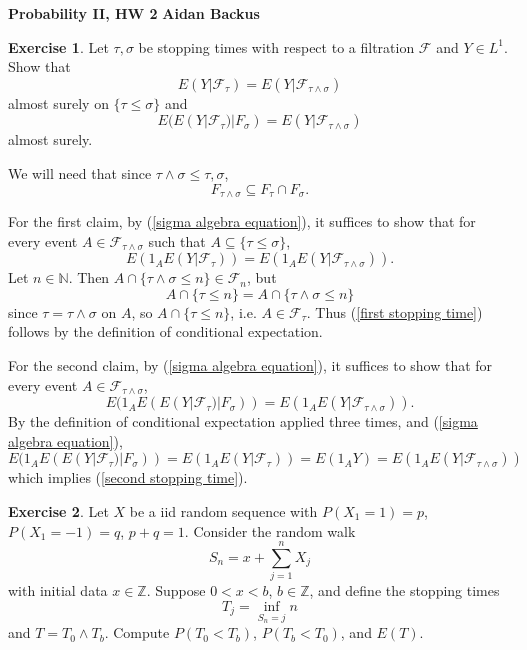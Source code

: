 \documentclass[10pt]{article}
\newcommand{\NN}{\mathbb{N}}
\newcommand{\ZZ}{\mathbb{Z}}
\theoremstyle{definition}
\newtheorem{exer}{Exercise}
\begin{document}
\noindent
\large\textbf{Probability II, HW 2} \hfill \textbf{Aidan Backus} \\

\begin{exer}
Let $\tau, \sigma$ be stopping times with respect to a filtration $\mathcal F$ and $Y \in L^1$. Show that
$$E(Y|\mathcal F_\tau) = E(Y|\mathcal F_{\tau \wedge \sigma})$$
almost surely on $\{\tau \leq \sigma\}$ and
$$E(E(Y|\mathcal F_\tau)|F_\sigma) = E(Y|\mathcal F_{\tau \wedge \sigma})$$
almost surely.
\end{exer}

We will need that since $\tau \wedge \sigma \leq \tau,\sigma$,
\begin{equation}
\label{sigma algebra equation}
F_{\tau \wedge \sigma} \subseteq F_\tau \cap F_\sigma.
\end{equation}

For the first claim, by (\ref{sigma algebra equation}), it suffices to show that for every event $A \in \mathcal F_{\tau \wedge \sigma}$ such that $A \subseteq \{\tau \leq \sigma\}$,
\begin{equation}
\label{first stopping time}
E(1_A E(Y|\mathcal F_\tau)) = E(1_A E(Y|\mathcal F_{\tau \wedge \sigma})).
\end{equation}
Let $n \in \NN$. Then $A \cap \{\tau \wedge \sigma \leq n\} \in \mathcal F_n$, but
$$A \cap \{\tau \leq n\} = A \cap \{\tau \wedge \sigma \leq n\}$$
since $\tau = \tau \wedge \sigma$ on $A$, so $A \cap \{\tau \leq n\}$, i.e. $A \in \mathcal F_\tau$.
Thus (\ref{first stopping time}) follows by the definition of conditional expectation.

For the second claim, by (\ref{sigma algebra equation}), it suffices to show that for every event $A \in \mathcal F_{\tau \wedge \sigma}$,
\begin{equation}
\label{second stopping time}
E(1_A E(E(Y|\mathcal F_\tau)|F_\sigma)) = E(1_A E(Y|\mathcal F_{\tau \wedge \sigma})).
\end{equation}
By the definition of conditional expectation applied three times, and (\ref{sigma algebra equation}),
$$E(1_A E(E(Y|\mathcal F_\tau)|F_\sigma)) = E(1_A E(Y|\mathcal F_\tau)) = E(1_A Y) = E(1_A E(Y|\mathcal F_{\tau \wedge \sigma}))$$
which implies (\ref{second stopping time}).

\begin{exer}
Let $X$ be a iid random sequence with $P(X_1 = 1) = p$, $P(X_1 = -1) = q$, $p + q = 1$.
Consider the random walk
$$S_n = x + \sum_{j=1}^n X_j$$
with initial data $x \in \ZZ$.
Suppose $0 < x < b$, $b \in \ZZ$, and define the stopping times
$$T_j = \inf_{S_n = j} n$$
and $T = T_0 \wedge T_b$. Compute $P(T_0 < T_b)$, $P(T_b < T_0)$, and $E(T)$.
\end{exer}
\end{document}
